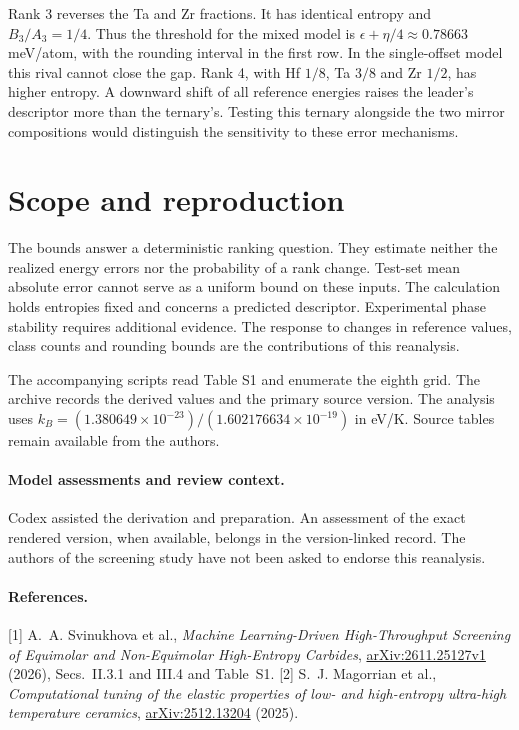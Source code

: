 \documentclass[11pt]{article}
\begin{document}
Rank 3 reverses the Ta and Zr fractions. It has identical entropy and $B_3/A_3=1/4$. Thus the threshold for the mixed model is $\epsilon+\eta/4\approx0.78663$ meV/atom, with the rounding interval in the first row. In the single-offset model this rival cannot close the gap. Rank 4, with Hf $1/8$, Ta $3/8$ and Zr $1/2$, has higher entropy. A downward shift of all reference energies raises the leader's descriptor more than the ternary's. Testing this ternary alongside the two mirror compositions would distinguish the sensitivity to these error mechanisms.

\section{Scope and reproduction}
The bounds answer a deterministic ranking question. They estimate neither the realized energy errors nor the probability of a rank change. Test-set mean absolute error cannot serve as a uniform bound on these inputs. The calculation holds entropies fixed and concerns a predicted descriptor. Experimental phase stability requires additional evidence. The response to changes in reference values, class counts and rounding bounds are the contributions of this reanalysis.

The accompanying scripts read Table S1 and enumerate the eighth grid. The archive records the derived values and the primary source version. The analysis uses $k_B=(1.380649\times10^{-23})/(1.602176634\times10^{-19})$ in eV/K. Source tables remain available from the authors.
\paragraph{Model assessments and review context.} Codex assisted the derivation and preparation. An assessment of the exact rendered version, when available, belongs in the version-linked record. The authors of the screening study have not been asked to endorse this reanalysis.
\paragraph{References.} [1] A.~A. Svinukhova et al., \emph{Machine Learning-Driven High-Throughput Screening of Equimolar and Non-Equimolar High-Entropy Carbides}, \href{https://arxiv.org/abs/2611.25127v1}{arXiv:2611.25127v1} (2026), Secs.~II.3.1 and III.4 and Table~S1.
[2] S.~J. Magorrian et al., \emph{Computational tuning of the elastic properties of low- and high-entropy ultra-high temperature ceramics}, \href{https://arxiv.org/abs/2512.13204}{arXiv:2512.13204} (2025).
\end{document}
